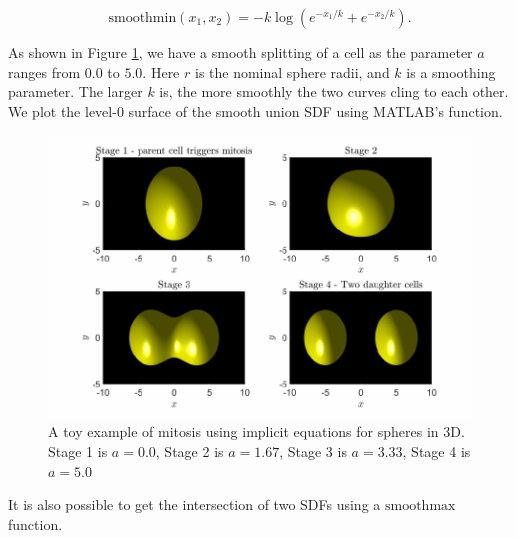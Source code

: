 \begin{equation}
    \textrm{smoothmin}(x_1, x_2) = -k \log(e^{-x_1/k} + e^{-x_2/k}).
\end{equation}

As shown in Figure \ref{fig:ToyMitosis}, we have a smooth splitting of a 
cell as the parameter $a$ ranges from $0.0$ to $5.0$. Here $r$ is the
nominal sphere radii, and $k$ is a smoothing parameter. The larger $k$ 
is, the more smoothly the two curves cling to each other. We plot the 
level-$0$ surface of the smooth union SDF using MATLAB's 
 function. 

\begin{figure}[h]
\centering
\includegraphics[width=1\textwidth]{chapter1/figures/CellDivisionDemo.pdf}
\caption{A toy example of mitosis using implicit equations for spheres in 3D. 
Stage 1 is $a= 0.0$, Stage 2 is $a= 1.67$, Stage 3 is $a=3.33$, Stage 4 is $a = 5.0$}
\label{fig:ToyMitosis}
\end{figure}
\filbreak
It is also possible to get the intersection of two SDFs using a $\textrm{smoothmax}$ function.

